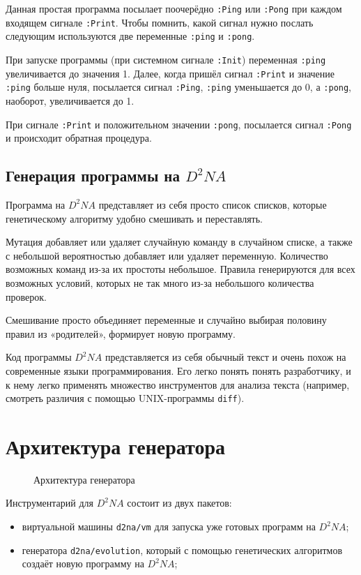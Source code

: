 \documentclass[utf8,a5paper,portrait,12pt]{eskdtext}
\begin{document}
Данная простая программа посылает поочерёдно \texttt{:Ping} или \texttt{:Pong}
при каждом входящем сигнале \texttt{:Print}. Чтобы помнить, какой сигнал нужно
послать следующим используются две переменные \texttt{:ping} и \texttt{:pong}.

При запуске программы (при системном сигнале \texttt{:Init}) переменная
\texttt{:ping} увеличивается до значения 1. Далее, когда пришёл сигнал
\texttt{:Print} и значение \texttt{:ping} больше нуля, посылается сигнал
\texttt{:Ping}, \texttt{:ping} уменьшается до 0, а \texttt{:pong}, наоборот,
увеличивается до 1.

При сигнале \texttt{:Print} и положительном значении \texttt{:pong}, посылается
сигнал \texttt{:Pong} и происходит обратная процедура.

\subsection{Генерация программы на $D^2NA$}
Программа на $D^2NA$ представляет из себя просто список списков, которые
генетическому алгоритму удобно смешивать и переставлять.

Мутация добавляет или удаляет случайную команду в случайном списке, а также с
небольшой вероятностью добавляет или удаляет переменную. Количество возможных
команд из-за их простоты небольшое. Правила генерируются для всех возможных
условий, которых не так много из-за небольшого количества проверок.

Смешивание просто объединяет переменные и случайно выбирая половину правил из
«родителей», формирует новую программу.

Код программы $D^2NA$ представляется из себя обычный текст и очень похож на
современные языки программирования. Его легко понять понять разработчику,
и к нему легко применять множество инструментов для анализа текста (например,
смотреть различия с помощью UNIX-программы \texttt{diff}).

\newpage
\section{Архитектура генератора}

\begin{figure}
  \centering
  
  \caption{Архитектура генератора}
\end{figure}

Инструментарий для $D^2NA$ состоит из двух пакетов:
\begin{itemize}
  \item виртуальной машины \texttt{d2na/vm} для запуска уже готовых программ на
        $D^2NA$;
  \item генератора \texttt{d2na/evolution}, который с помощью генетических
        алгоритмов создаёт новую программу на $D^2NA$;
\end{itemize}
\end{document}
